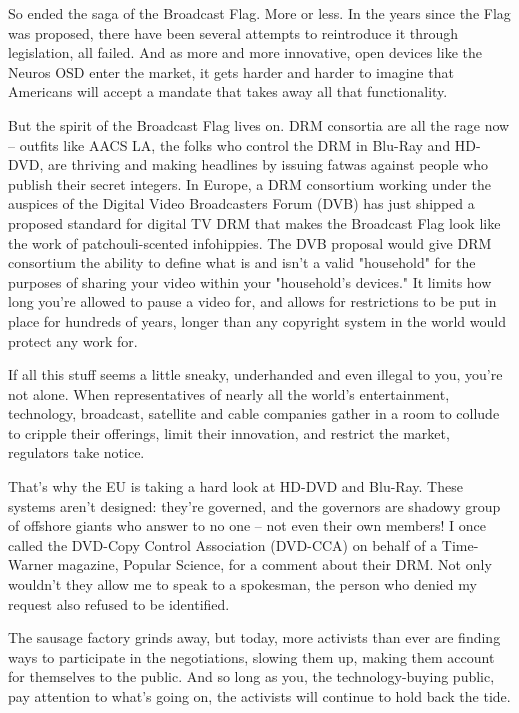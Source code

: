 So ended the saga of the Broadcast Flag. More or less. In the years
since the Flag was proposed, there have been several attempts to
reintroduce it through legislation, all failed. And as more and
more innovative, open devices like the Neuros OSD enter the market,
it gets harder and harder to imagine that Americans will accept a
mandate that takes away all that functionality.

But the spirit of the Broadcast Flag lives on. DRM consortia are
all the rage now -- outfits like AACS LA, the folks who control the
DRM in Blu-Ray and HD-DVD, are thriving and making headlines by
issuing fatwas against people who publish their secret integers. In
Europe, a DRM consortium working under the auspices of the Digital
Video Broadcasters Forum (DVB) has just shipped a proposed standard
for digital TV DRM that makes the Broadcast Flag look like the work
of patchouli-scented infohippies. The DVB proposal would give DRM
consortium the ability to define what is and isn't a valid
"household" for the purposes of sharing your video within your
"household's devices." It limits how long you're allowed to pause a
video for, and allows for restrictions to be put in place for
hundreds of years, longer than any copyright system in the world
would protect any work for.

If all this stuff seems a little sneaky, underhanded and even
illegal to you, you're not alone. When representatives of nearly
all the world's entertainment, technology, broadcast, satellite and
cable companies gather in a room to collude to cripple their
offerings, limit their innovation, and restrict the market,
regulators take notice.

That's why the EU is taking a hard look at HD-DVD and Blu-Ray.
These systems aren't designed: they're governed, and the governors
are shadowy group of offshore giants who answer to no one -- not
even their own members! I once called the DVD-Copy Control
Association (DVD-CCA) on behalf of a Time-Warner magazine, Popular
Science, for a comment about their DRM. Not only wouldn't they
allow me to speak to a spokesman, the person who denied my request
also refused to be identified.

The sausage factory grinds away, but today, more activists than
ever are finding ways to participate in the negotiations, slowing
them up, making them account for themselves to the public. And so
long as you, the technology-buying public, pay attention to what's
going on, the activists will continue to hold back the tide.

